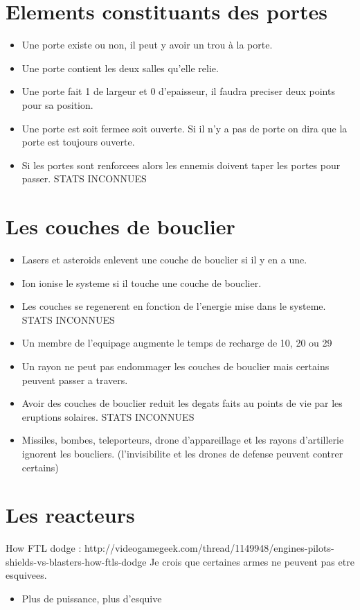 \documentclass[a4paper, 11pt]{article}
\begin{document}
\section{Elements constituants des portes}

\begin{itemize}
	\item Une porte existe ou non, il peut y avoir un trou à la porte.
	\item Une porte contient les deux salles qu'elle relie.
	\item Une porte fait 1 de largeur et 0 d'epaisseur, il faudra preciser deux points pour sa position.
	\item Une porte est soit fermee soit ouverte. Si il n'y a pas de porte on dira que la porte est toujours ouverte.
	\item Si les portes sont renforcees alors les ennemis doivent taper les portes pour passer. STATS INCONNUES
\end{itemize}

\section{Les couches de bouclier}

\begin{itemize}
	\item Lasers et asteroids enlevent une couche de bouclier si il y en a une.
	\item Ion ionise le systeme si il touche une couche de bouclier.
	\item Les couches se regenerent en fonction de l'energie mise dans le systeme. STATS INCONNUES
	\item Un membre de l'equipage augmente le temps de recharge de 10, 20 ou 29%
	\item Un rayon ne peut pas endommager les couches de bouclier mais certains peuvent passer a travers.
	\item Avoir des couches de bouclier reduit les degats faits au points de vie par les eruptions solaires. STATS INCONNUES
	\item Missiles, bombes, teleporteurs, drone d'appareillage et les rayons d'artillerie ignorent les boucliers. (l'invisibilite et les drones de defense peuvent contrer certains)
\end{itemize}

\section{Les reacteurs}

How FTL dodge : http://videogamegeek.com/thread/1149948/engines-pilots-shields-vs-blasters-how-ftls-dodge
Je crois que certaines armes ne peuvent pas etre esquivees.
\begin{itemize}
	\item Plus de puissance, plus d'esquive
\end{itemize}
\end{document}
